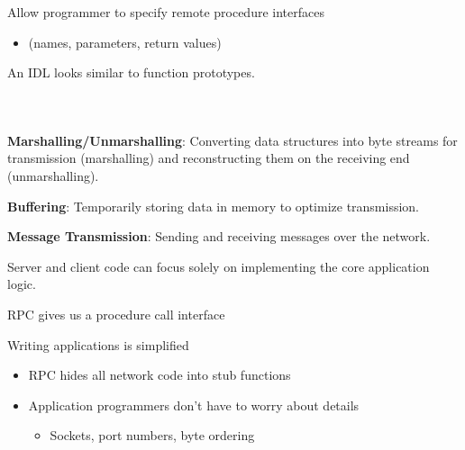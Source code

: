 \begin{slide}

	
	Allow programmer to specify remote procedure interfaces
	\begin{itemize}
		\item (names, parameters, return values)
	\end{itemize}

	An IDL looks similar to function prototypes.
	
\end{slide}

\begin{slide}


    \inputminted{python}{Adder.idl}

\end{slide}

\begin{slide}


    \inputminted{python}{server.py}
    \bigskip

    \inputminted{python}{client.py}

\end{slide}

\begin{slide}

    
    \textbf{Marshalling/Unmarshalling}: Converting data structures into byte streams for transmission (marshalling) and reconstructing them on the receiving end (unmarshalling).
    \bigskip

    \textbf{Buffering}: Temporarily storing data in memory to optimize transmission.
    \bigskip

    \textbf{Message Transmission}: Sending and receiving messages over the network.
    \bigskip

    Server and client code can focus solely on implementing the core application logic.

\end{slide}

\begin{slide}


	RPC gives us a procedure call interface
	\bigskip
	
	Writing applications is simplified
	\begin{itemize}
		\item RPC hides all network code into stub functions
		\item Application programmers don't have to worry about details
		\begin{itemize}
			\item Sockets, port numbers, byte ordering
		\end{itemize}
	\end{itemize}
	
\end{slide}


